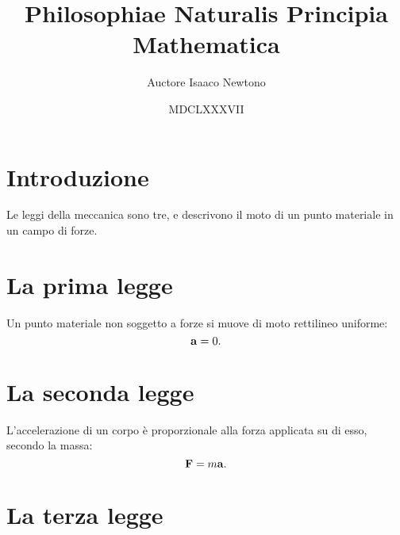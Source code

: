 \documentclass{article}
\title{Philosophiae Naturalis Principia Mathematica}
\author{Auctore Isaaco Newtono}
\date{MDCLXXXVII}
\begin{document}
\maketitle

\section{Introduzione}
Le leggi della meccanica sono tre, e descrivono il moto di un punto materiale in un campo di forze.

\section{La prima legge}
Un punto materiale non soggetto a forze si muove di moto rettilineo uniforme:
\begin{equation}
	\vb a = 0.
\end{equation}

\section{La seconda legge}
L'accelerazione di un corpo \`e proporzionale alla forza applicata su di esso, secondo la massa:
\begin{equation}
	\vb F = m \vb a.
\end{equation}

\section{La terza legge}
\end{document}
